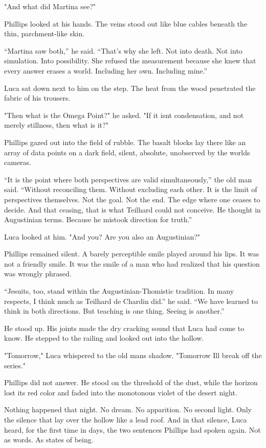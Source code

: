 \documentclass[
  ngerman,
]{article}
\begin{document}
"And what did Martina see?"

Phillips looked at his hands. The veins stood out like blue cables
beneath the thin, parchment-like skin.

``Martina saw both,'' he said. ``That's why she left. Not into death.
Not into simulation. Into possibility. She refused the measurement
because she knew that every answer erases a world. Including her own.
Including mine.''

Luca sat down next to him on the step. The heat from the wood penetrated
the fabric of his trousers.

"Then what is the Omega Point?" he asked. "If it isn\textquotesingle t
condensation, and not merely stillness, then what is it?"

Phillips gazed out into the field of rubble. The basalt blocks lay there
like an array of data points on a dark field, silent, absolute,
unobserved by the world\textquotesingle s cameras.

``It is the point where both perspectives are valid simultaneously,''
the old man said. ``Without reconciling them. Without excluding each
other. It is the limit of perspectives themselves. Not the goal. Not the
end. The edge where one ceases to decide. And that ceasing, that is what
Teilhard could not conceive. He thought in Augustinian terms. Because he
mistook direction for truth.''

Luca looked at him. "And you? Are you also an Augustinian?"

Phillips remained silent. A barely perceptible smile played around his
lips. It was not a friendly smile. It was the smile of a man who had
realized that his question was wrongly phrased.

``Jesuits, too, stand within the Augustinian-Thomistic tradition. In
many respects, I think much as Teilhard de Chardin did.'' he said. ``We
have learned to think in both directions. But teaching is one thing.
Seeing is another.''

He stood up. His joints made the dry cracking sound that Luca had come
to know. He stepped to the railing and looked out into the hollow.

"Tomorrow," Luca whispered to the old man\textquotesingle s shadow.
"Tomorrow I\textquotesingle ll break off the series."

Phillips did not answer. He stood on the threshold of the dust, while
the horizon lost its red color and faded into the monotonous violet of
the desert night.

Nothing happened that night. No dream. No apparition. No second light.
Only the silence that lay over the hollow like a lead roof. And in that
silence, Luca heard, for the first time in days, the two sentences
Phillips had spoken again. Not as words. As states of being.
\end{document}
